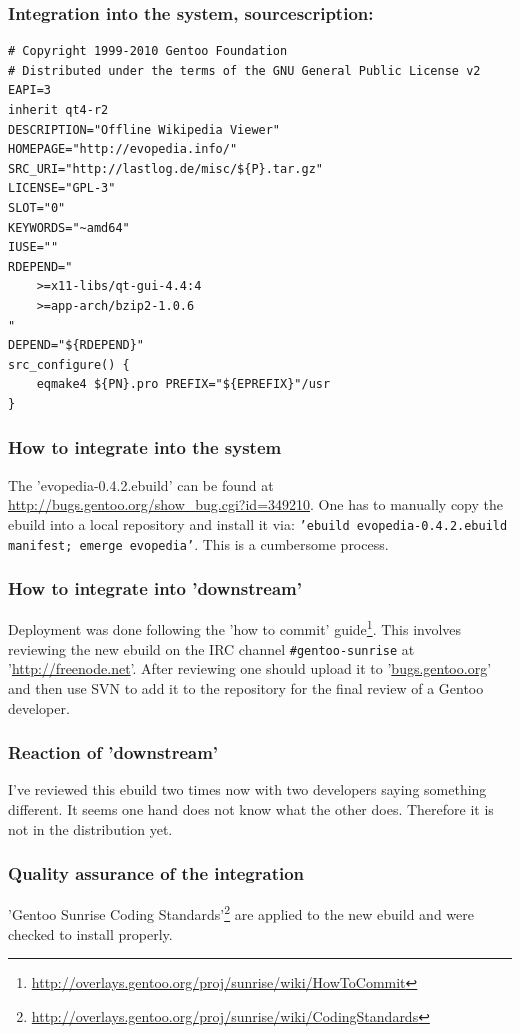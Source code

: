 \documentclass[a4paper,10pt]{article}
\begin{document}
\subsubsection*{Integration into the system, sourcescription:}
\begin{verbatim}
# Copyright 1999-2010 Gentoo Foundation
# Distributed under the terms of the GNU General Public License v2
EAPI=3
inherit qt4-r2
DESCRIPTION="Offline Wikipedia Viewer"
HOMEPAGE="http://evopedia.info/"
SRC_URI="http://lastlog.de/misc/${P}.tar.gz"
LICENSE="GPL-3"
SLOT="0"
KEYWORDS="~amd64"
IUSE=""
RDEPEND="
	>=x11-libs/qt-gui-4.4:4
	>=app-arch/bzip2-1.0.6
"
DEPEND="${RDEPEND}"
src_configure() {
	eqmake4 ${PN}.pro PREFIX="${EPREFIX}"/usr
}
\end{verbatim}

\subsubsection*{How to integrate into the system}
The 'evopedia-0.4.2.ebuild' can be found at \url{http://bugs.gentoo.org/show_bug.cgi?id=349210}. One has to manually copy the ebuild into a local repository and install it via: \texttt{'ebuild evopedia-0.4.2.ebuild manifest; emerge evopedia'}. This is a cumbersome process.

\subsubsection*{How to integrate into 'downstream'}
Deployment was done following the 'how to commit' guide\footnote{\url{http://overlays.gentoo.org/proj/sunrise/wiki/HowToCommit}}. This involves reviewing the new  ebuild on the IRC channel \texttt{\#gentoo-sunrise} at '\url{http://freenode.net}'. After reviewing one should upload it to '\url{bugs.gentoo.org}' and then use SVN to add it to the repository for the final review of a Gentoo developer.

\subsubsection*{Reaction of 'downstream'}
I've reviewed this ebuild two times now with two developers saying something different. It seems one hand does not know what the other does. Therefore it is not in the distribution yet.

\subsubsection*{Quality assurance of the integration}
'Gentoo Sunrise Coding Standards'\footnote{\url{http://overlays.gentoo.org/proj/sunrise/wiki/CodingStandards}} are applied to the new ebuild and were checked to install properly.
\end{document}
